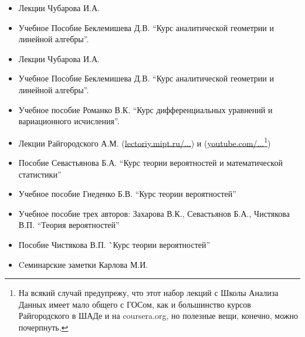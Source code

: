 \begin{itemize}[wide,  labelwidth=!, noitemsep, label=$\blacktriangleright$, labelindent = 0pt]
\item
Лекции Чубарова И.А. 
\item
Учебное Пособие Беклемишева Д.В. ``Курс аналитической геометрии и линейной алгебры''.
\end{itemize}

\begin{itemize}[wide,  labelwidth=!, noitemsep, label=$\blacktriangleright$, labelindent = 0pt]
\item
Лекции Чубарова И.А. 
\item
Учебное Пособие Беклемишева Д.В. ``Курс аналитической геометрии и линейной алгебры''.
\end{itemize}

\begin{itemize}[wide,  labelwidth=!, noitemsep, label=$\blacktriangleright$, labelindent = 0pt]
\item
Учебное пособие Романко В.К. ``Курс дифференциальных уравнений и вариационного исчисления''.
\end{itemize}

\begin{itemize}[wide,  labelwidth=!, noitemsep, label=$\blacktriangleright$, labelindent = 0pt]
\item
Лекции Райгородского А.М. (\href{http://lectoriy.mipt.ru/course/Maths-ProbabilityTheoryBasics-L15}{lectoriy.mipt.ru/...}) и (\href{https://www.youtube.com/playlist?list=PLJOzdkh8T5kouOIbZDCqzB72hBn9T7gsJ}{youtube.com/...\footnote{На всякий случай предупрежу, что этот набор лекций с Школы Анализа Данных имеет мало общего с ГОСом, как и большинство курсов Райгородского в ШАДе и на \href{https://www.coursera.org}{coursera.org}, но полезные вещи, конечно, можно почерпнуть.}})
\item
Пособие Севастьянова Б.А. ``Курс теории вероятностей и математической статистики''
\item
Учебное пособие Гнеденко Б.В. ``Курс теории вероятностей''
\item 
Учебное пособие трех авторов: Захарова В.К., Севастьянов Б.А., Чистякова В.П. ``Теория вероятностей''
\item
Пособие Чистякова В.П. \``Курс теории вероятностей''
\item
Cеминарские заметки Карлова М.И.
\end{itemize}

